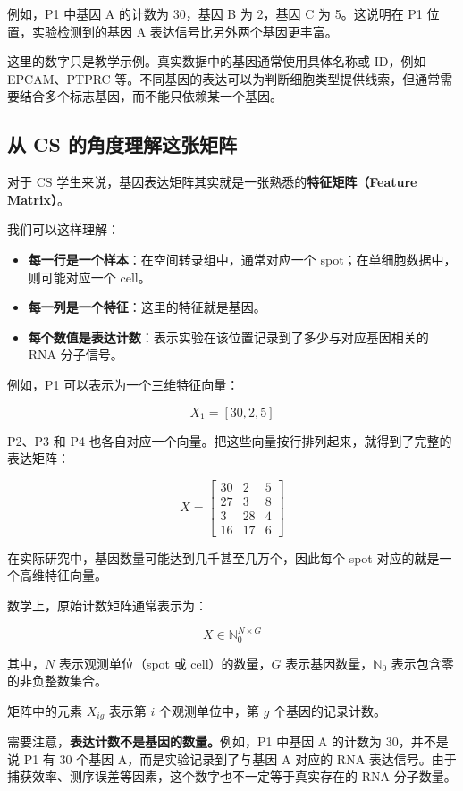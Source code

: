 \documentclass[UTF8,a4paper,11pt,fontset=fandol]{ctexart}
\begin{document}
例如，P1 中基因 A 的计数为 30，基因 B 为 2，基因 C 为 5。这说明在 P1 位置，实验检测到的基因 A 表达信号比另外两个基因更丰富。

这里的数字只是教学示例。真实数据中的基因通常使用具体名称或 ID，例如 EPCAM、PTPRC 等。不同基因的表达可以为判断细胞类型提供线索，但通常需要结合多个标志基因，而不能只依赖某一个基因。

\subsection{从 CS 的角度理解这张矩阵}

对于 CS 学生来说，基因表达矩阵其实就是一张熟悉的\textbf{特征矩阵（Feature Matrix）}。

我们可以这样理解：

\begin{itemize}
  \item \textbf{每一行是一个样本}：在空间转录组中，通常对应一个 spot；在单细胞数据中，则可能对应一个 cell。
  \item \textbf{每一列是一个特征}：这里的特征就是基因。
  \item \textbf{每个数值是表达计数}：表示实验在该位置记录到了多少与对应基因相关的 RNA 分子信号。
\end{itemize}

例如，P1 可以表示为一个三维特征向量：

\[
  X_1=[30,2,5]
\]

P2、P3 和 P4 也各自对应一个向量。把这些向量按行排列起来，就得到了完整的表达矩阵：

\[
  X=
  \begin{bmatrix}
  30 & 2 & 5\\
  27 & 3 & 8\\
  3 & 28 & 4\\
  16 & 17 & 6
  \end{bmatrix}
\]

在实际研究中，基因数量可能达到几千甚至几万个，因此每个 spot 对应的就是一个高维特征向量。

数学上，原始计数矩阵通常表示为：

\[
  X\in\mathbb{N}_0^{N\times G}
\]

其中，$N$ 表示观测单位（spot 或 cell）的数量，$G$ 表示基因数量，$\mathbb{N}_0$ 表示包含零的非负整数集合。

矩阵中的元素 $X_{ig}$ 表示第 $i$ 个观测单位中，第 $g$ 个基因的记录计数。

需要注意，\textbf{表达计数不是基因的数量。}例如，P1 中基因 A 的计数为 30，并不是说 P1 有 30 个基因 A，而是实验记录到了与基因 A 对应的 RNA 表达信号。由于捕获效率、测序误差等因素，这个数字也不一定等于真实存在的 RNA 分子数量。
\end{document}
